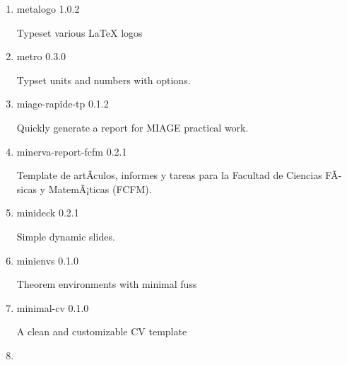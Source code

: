 \begin{enumerate}

  { meppp } { 0.2.1 }

  Template for modern physics experiment reports at the Physics School
  of PKU.
\item
  \href{/universe/package/metalogo/}{}

  { metalogo } { 1.0.2 }

  Typeset various LaTeX logos
\item
  \href{/universe/package/metro/}{}

  { metro } { 0.3.0 }

  Typset units and numbers with options.
\item
  \href{/universe/package/miage-rapide-tp/}{}


  { miage-rapide-tp } { 0.1.2 }

  Quickly generate a report for MIAGE practical work.
\item
  \href{/universe/package/minerva-report-fcfm/}{}


  { minerva-report-fcfm } { 0.2.1 }

  Template de artÃ­culos, informes y tareas para la Facultad de Ciencias
  FÃ­sicas y MatemÃ¡ticas (FCFM).
\item
  \href{/universe/package/minideck/}{}

  { minideck } { 0.2.1 }

  Simple dynamic slides.
\item
  \href{/universe/package/minienvs/}{}

  { minienvs } { 0.1.0 }

  Theorem environments with minimal fuss
\item
  \href{/universe/package/minimal-cv/}{}


  { minimal-cv } { 0.1.0 }

  A clean and customizable CV template
\item
  \href{/universe/package/minimal-presentation/}{}


\end{enumerate}
